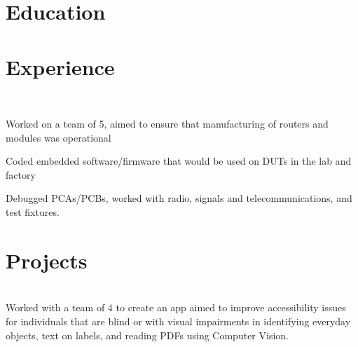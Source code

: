 \documentclass[]{deedy-resume-openfont}
\begin{document}
%
%

%
%


\hfill
\begin{minipage}[t]{1\textwidth} 


\section{Education}
\sectionsep

\section{Experience }
 \\
\vspace{\topsep} %
\begin{tightemize}
\item Worked on a team of 5, aimed to ensure that manufacturing of routers and modules was operational
\item Coded embedded software/firmware that would be used on DUTs in the lab and factory 
\item Debugged PCAs/PCBs, worked with radio, signals and telecommunications, and test fixtures.
\end{tightemize}
\sectionsep


\section{Projects}
 \\
Worked with a team of 4 to create an app aimed to improve accessibility issues for individuals that are blind or with visual impairments in identifying everyday objects, text on labels, and reading PDFs using Computer Vision.
\sectionsep


\end{minipage}
\end{document}
